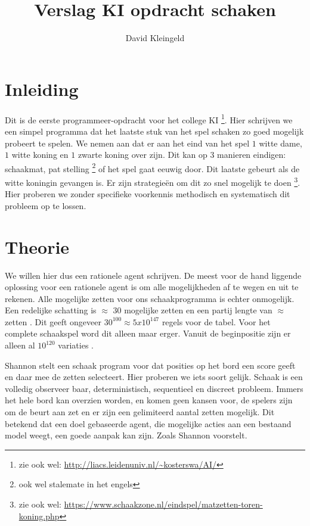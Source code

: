 \documentclass[10pt]{article}
\author{David Kleingeld}
\title{Verslag KI opdracht schaken }
\begin{document}

\maketitle

\section{Inleiding}

Dit is de eerste programmeer-opdracht voor het college KI \footnote{zie ook wel: \url{http://liacs.leidenuniv.nl/~kosterswa/AI/}}. Hier schrijven we een simpel programma dat het laatste stuk van het spel schaken zo goed mogelijk probeert te spelen. We nemen aan dat er aan het eind van het spel $1$ witte dame, $1$ witte koning en $1$ zwarte koning over zijn. Dit kan op 3 manieren eindigen: schaakmat, pat stelling \footnote{ook wel stalemate in het engels} of het spel gaat eeuwig door. Dit laatste gebeurt als de witte koningin gevangen is. Er zijn strategieën om dit zo snel mogelijk te doen \footnote{zie ook wel: \url{https://www.schaakzone.nl/eindspel/matzetten-toren-koning.php}}. Hier proberen we zonder specifieke voorkennis methodisch en systematisch dit probleem op te lossen.

\section{Theorie}

We willen hier dus een rationele agent schrijven. De meest voor de hand liggende oplossing voor een rationele agent is om alle mogelijkheden af te wegen en uit te rekenen. Alle mogelijke zetten voor ons schaakprogramma is echter onmogelijk. Een redelijke schatting is $\approx$ 30 \cite{Shannon:1988} mogelijke zetten en een partij lengte van $\approx$ zetten \cite{kosters:lecture2:sheet9}. Dit geeft ongeveer $30^{100} \approx 5x10^{147}$ regels voor de tabel. Voor het complete schaakspel word dit alleen maar erger. Vanuit de beginpositie zijn er alleen al $10^{120}$ variaties \cite{Shannon:1988}.

Shannon stelt een schaak program voor dat posities op het bord een score geeft en daar mee de zetten selecteert. Hier proberen we iets soort gelijk. Schaak is een volledig observeer baar, deterministisch, sequentieel en discreet probleem. Immers het hele bord kan overzien worden, en komen geen kansen voor, de spelers zijn om de beurt aan zet en er zijn een gelimiteerd aantal zetten mogelijk. Dit betekend dat een doel gebaseerde agent, die mogelijke acties aan een bestaand model weegt, een goede aanpak kan zijn. Zoals Shannon voorstelt.
\end{document}
